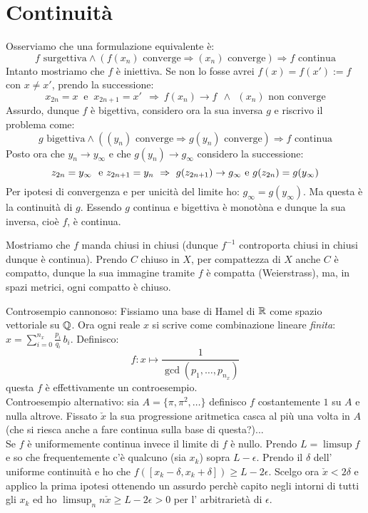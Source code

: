 \section{Continuità}

 Osserviamo che una formulazione equivalente è:
$$ f\mbox{ surgettiva} \wedge \left( f(x_n)\mbox{ converge} \Rightarrow (x_n) \mbox{ converge} \right) \Rightarrow f \mbox{ continua} $$
Intanto mostriamo che $f$ è iniettiva. Se non lo fosse avrei $f(x)=f(x'):=f$ con $x\neq x'$, prendo la successione:
$$ x_{2n}=x\ \mbox{ e }\ x_{2n+1}=x'\ \ \Rightarrow\ f(x_n)\rightarrow f\ \  \wedge\ \ (x_n) \mbox{ non converge} $$
Assurdo, dunque $f$ è bigettiva, considero ora la sua inversa $g$ e riscrivo il problema come:
$$ g\mbox{ bigettiva} \wedge \left( (y_n)\mbox{ converge} \Rightarrow g(y_n) \mbox{ converge} \right) \Rightarrow f \mbox{ continua} $$
Posto ora che $y_n\rightarrow y_{\infty}$ e che $g(y_n)\rightarrow g_{\infty}$ considero la successione:
$$ z_{2n}=y_{\infty}\  \mbox{ e}\  z_{2n+1}=y_n\ \Rightarrow\  g(z_{2n+1})\rightarrow g_{\infty}\\ \mbox{ e}\  g(z_{2n})=g(y_{\infty}) $$
Per ipotesi di convergenza e per unicità del limite ho: $ g_{\infty}=g(y_{\infty})$. Ma questa è la continuità di $g$. Essendo $g$ continua e bigettiva è monotòna e dunque la sua inversa, cioè $f$, è continua.

Mostriamo che $f$ manda chiusi in chiusi (dunque $f^{-1}$ controporta chiusi in chiusi dunque è continua). Prendo $C$ chiuso in $X$, per compattezza di $X$ anche $C$ è compatto, dunque la sua immagine tramite $f$ è compatta (Weierstrass), ma, in spazi metrici, ogni compatto è chiuso. 

Controsempio cannonoso: Fissiamo una base di Hamel di $\mathbb{R}$ come spazio vettoriale su $\mathbb{Q}$. Ora ogni reale $x$ si scrive come combinazione lineare {\it finita}: $x=\sum_{i=0}^{n_x} \frac{p_i}{q_i}\, b_i$. Definisco:
$$ f:x\mapsto \frac{1}{\gcd(p_1,\ldots,p_{n_x})} $$ 
questa $f$ è effettivamente un controesempio.\\
Controesempio alternativo: sia $A=\{\pi,\pi^2,\ldots\}$ definisco $f$ costantemente $1$ su $A$ e nulla altrove. Fissato $\check{x}$ la sua progressione aritmetica casca al più una volta in $A$ (che si riesca anche a fare continua sulla base di questa?)...\\
Se $f$ è uniformemente continua invece il limite di $f$ è nullo. Prendo $L=\limsup f$ e so che frequentemente c'è qualcuno (sia $x_k$) sopra $L-\epsilon$. Prendo il $\delta$ dell' uniforme continuità e ho che $f([x_k-\delta,x_k+\delta])\ge L-2\epsilon$. Scelgo ora $\check{x}<2\delta$ e applico la prima ipotesi ottenendo un assurdo perchè capito negli intorni di tutti gli $x_k$ ed ho $\limsup_n n\check{x}\ge L-2\epsilon>0$ per l' arbitrarietà di $\epsilon$.

